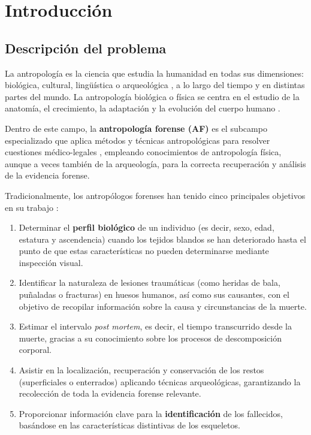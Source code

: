 
\chapter{Introducción}


\section{Descripción del problema}

La antropología es la ciencia que estudia la humanidad en todas sus dimensiones: biológica, cultural, 
lingüística o arqueológica \cite{AAA2022AnthropologyDefinition}, a lo largo del tiempo y en distintas partes 
del mundo. La antropología biológica o física se centra en el estudio de la anatomía, el crecimiento, la 
adaptación y la evolución del cuerpo humano \cite{nawrocki2006}. 

Dentro de este campo, la \textbf{antropología forense (AF)} es el subcampo especializado que aplica métodos y 
técnicas antropológicas para resolver cuestiones médico-legales \cite{nawrocki2006}, empleando conocimientos 
de antropología física, aunque a veces también de la arqueología, para la correcta recuperación y análisis de 
la evidencia forense.

Tradicionalmente, los antropólogos forenses han tenido cinco principales objetivos en su trabajo 
\cite{byers2023}:

\begin{enumerate}

    \item Determinar el \textbf{perfil biológico} de un individuo (es decir, sexo, edad, estatura y 
    ascendencia) cuando los tejidos blandos se han deteriorado hasta el punto de que estas características no 
    pueden determinarse mediante inspección visual. 

    \item Identificar la naturaleza de lesiones traumáticas (como heridas de bala, puñaladas o fracturas) en 
    huesos humanos, así como sus causantes, con el objetivo de recopilar información sobre la causa y 
    circunstancias de la muerte.

    \item Estimar el intervalo \textit{post mortem}, es decir, el tiempo transcurrido desde la muerte, gracias 
    a su conocimiento sobre los procesos de descomposición corporal.
    
    \item Asistir en la localización, recuperación y conservación de los restos (superficiales o enterrados) 
    aplicando técnicas arqueológicas, garantizando la recolección de toda la evidencia forense relevante.

    \item Proporcionar información clave para la \textbf{identificación} de los fallecidos, basándose en las 
    características distintivas de los esqueletos.

\end{enumerate}

